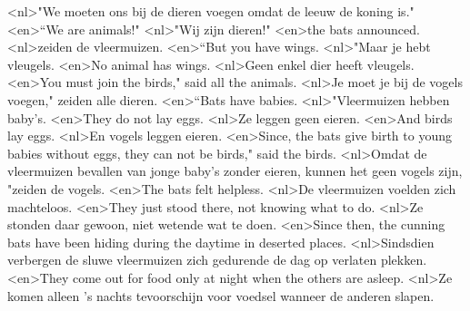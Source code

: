 <nl>"We moeten ons bij de dieren voegen omdat de leeuw de koning is."
<en>“We are animals!"
<nl>"Wij zijn dieren!"
<en>the bats announced.
<nl>zeiden de vleermuizen.
<en>“But you have wings.
<nl>"Maar je hebt vleugels.
<en>No animal has wings.
<nl>Geen enkel dier heeft vleugels.
<en>You must join the birds," said all the animals.
<nl>Je moet je bij de vogels voegen," zeiden alle dieren.
<en>“Bats have babies.
<nl>"Vleermuizen hebben baby's.
<en>They do not lay eggs.
<nl>Ze leggen geen eieren.
<en>And birds lay eggs.
<nl>En vogels leggen eieren.
<en>Since, the bats give birth to young babies without eggs, they can not be birds," said the birds.
<nl>Omdat de vleermuizen bevallen van jonge baby's zonder eieren, kunnen het geen vogels zijn, "zeiden de vogels.
<en>The bats felt helpless.
<nl>De vleermuizen voelden zich machteloos.
<en>They just stood there, not knowing what to do.
<nl>Ze stonden daar gewoon, niet wetende wat te doen.
<en>Since then, the cunning bats have been hiding during the daytime in deserted places.
<nl>Sindsdien verbergen de sluwe vleermuizen zich gedurende de dag op verlaten plekken.
<en>They come out for food only at night when the others are asleep.
<nl>Ze komen alleen  's nachts tevoorschijn voor voedsel  wanneer de anderen slapen.
